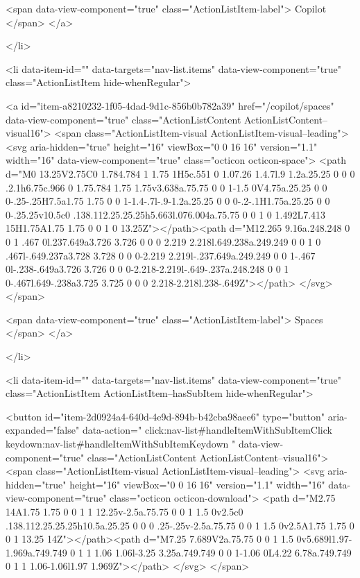        <span data-view-component="true" class="ActionListItem-label">
          Copilot
</span>      
</a>
  
</li>

        
          
<li data-item-id="" data-targets="nav-list.items" data-view-component="true" class="ActionListItem hide-whenRegular">
    
    
    <a id="item-a8210232-1f05-4dad-9d1c-856b0b782a39" href="/copilot/spaces" data-view-component="true" class="ActionListContent ActionListContent--visual16">
        <span class="ActionListItem-visual ActionListItem-visual--leading">
          <svg aria-hidden="true" height="16" viewBox="0 0 16 16" version="1.1" width="16" data-view-component="true" class="octicon octicon-space">
    <path d="M0 13.25V2.75C0 1.784.784 1 1.75 1H5c.551 0 1.07.26 1.4.7l.9 1.2a.25.25 0 0 0 .2.1h6.75c.966 0 1.75.784 1.75 1.75v3.638a.75.75 0 0 1-1.5 0V4.75a.25.25 0 0 0-.25-.25H7.5a1.75 1.75 0 0 1-1.4-.7l-.9-1.2a.25.25 0 0 0-.2-.1H1.75a.25.25 0 0 0-.25.25v10.5c0 .138.112.25.25.25h5.663l.076.004a.75.75 0 0 1 0 1.492L7.413 15H1.75A1.75 1.75 0 0 1 0 13.25Z"></path><path d="M12.265 9.16a.248.248 0 0 1 .467 0l.237.649a3.726 3.726 0 0 0 2.219 2.218l.649.238a.249.249 0 0 1 0 .467l-.649.237a3.728 3.728 0 0 0-2.219 2.219l-.237.649a.249.249 0 0 1-.467 0l-.238-.649a3.726 3.726 0 0 0-2.218-2.219l-.649-.237a.248.248 0 0 1 0-.467l.649-.238a3.725 3.725 0 0 0 2.218-2.218l.238-.649Z"></path>
</svg>
        </span>
      
        <span data-view-component="true" class="ActionListItem-label">
          Spaces
</span>      
</a>
  
</li>

        
          
<li data-item-id="" data-targets="nav-list.items" data-view-component="true" class="ActionListItem ActionListItem--hasSubItem hide-whenRegular">
    
    
    <button id="item-2d0924a4-640d-4e9d-894b-b42cba98aee6" type="button" aria-expanded="false" data-action="
            click:nav-list#handleItemWithSubItemClick
            keydown:nav-list#handleItemWithSubItemKeydown
          " data-view-component="true" class="ActionListContent ActionListContent--visual16">
        <span class="ActionListItem-visual ActionListItem-visual--leading">
          <svg aria-hidden="true" height="16" viewBox="0 0 16 16" version="1.1" width="16" data-view-component="true" class="octicon octicon-download">
    <path d="M2.75 14A1.75 1.75 0 0 1 1 12.25v-2.5a.75.75 0 0 1 1.5 0v2.5c0 .138.112.25.25.25h10.5a.25.25 0 0 0 .25-.25v-2.5a.75.75 0 0 1 1.5 0v2.5A1.75 1.75 0 0 1 13.25 14Z"></path><path d="M7.25 7.689V2a.75.75 0 0 1 1.5 0v5.689l1.97-1.969a.749.749 0 1 1 1.06 1.06l-3.25 3.25a.749.749 0 0 1-1.06 0L4.22 6.78a.749.749 0 1 1 1.06-1.06l1.97 1.969Z"></path>
</svg>
        </span>
      

